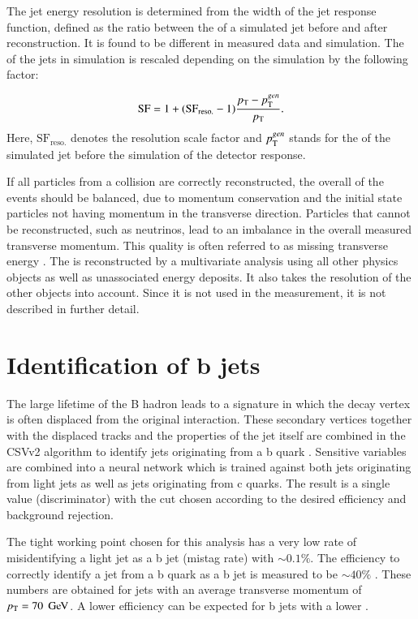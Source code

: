 The jet energy resolution is determined from the width of the jet response function, defined as the ratio between the \pt of a simulated jet before and after reconstruction. It is found to be different in measured data and simulation. The \pt of the jets in simulation is rescaled depending on the simulation by the following
factor:

\begin{equation}
\mathrm{SF} = 1 + (\mathrm{SF}_{\mathrm{reso.}}-1) \frac{p_{\mathrm{T}} - p_{\mathrm{T}}^{gen}}{p_{\mathrm{T}}}.
\end{equation}
Here, $\mathrm{SF}_{\mathrm{reso.}}$ denotes the resolution scale factor and $p_{\mathrm{T}}^{gen}$ stands for the \pt of the simulated jet before the simulation of the detector response. 

If all particles from a collision are correctly reconstructed, the overall \pt of the events should be balanced, due to momentum conservation and the initial state particles not having momentum in the transverse direction.
Particles that cannot be reconstructed, such as neutrinos, lead to an imbalance in the overall measured transverse momentum. This quality is often referred to as missing transverse energy \ETmiss \cite{CMS-PAS-JME-16-004}.
The \ETmiss is reconstructed by a multivariate analysis using all other physics objects as well as unassociated energy deposits. It also takes the resolution of the other objects into account.
Since it is not used in the measurement, it is not described in further detail.

\section{Identification of b jets}
\label{sec:SimReco_BjetReco}


The large lifetime of the B hadron leads to a signature in which the decay vertex is often displaced from the original interaction.
These secondary vertices together with the displaced tracks and the properties of the jet itself are combined in the CSVv2 algorithm to identify jets originating from a b quark \cite{BTV16002}.
Sensitive variables are combined into a neural network which is trained against both jets originating from light jets as well as jets originating from c quarks.
The result is a single value (discriminator) with the cut chosen according to the desired efficiency and background rejection.

The tight working point chosen for this analysis has a very low rate of misidentifying a light jet as a b jet (mistag rate) with $\sim0.1\%$. The efficiency to correctly identify a jet from a b quark
as a b jet is measured to be $\sim40\%$ \cite{BTV16002}. These numbers are obtained for jets with an average transverse momentum of $p_{\mathrm{T}} = 70\;\,\text{Ge\hspace{-.08em}V}$. A lower efficiency can be expected for b jets with a lower \pt.

